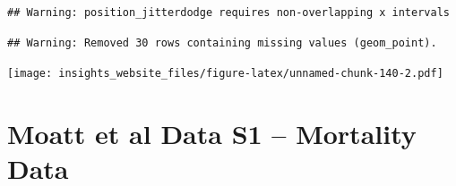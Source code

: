 \documentclass[]{book}
\newenvironment{Shaded}{\begin{snugshade}}{\end{snugshade}}
\newcommand{\DataTypeTok}[1]{\textcolor[rgb]{0.13,0.29,0.53}{#1}}
\newcommand{\DecValTok}[1]{\textcolor[rgb]{0.00,0.00,0.81}{#1}}
\newcommand{\FloatTok}[1]{\textcolor[rgb]{0.00,0.00,0.81}{#1}}
\newcommand{\KeywordTok}[1]{\textcolor[rgb]{0.13,0.29,0.53}{\textbf{#1}}}
\newcommand{\NormalTok}[1]{#1}
\newcommand{\OperatorTok}[1]{\textcolor[rgb]{0.81,0.36,0.00}{\textbf{#1}}}
\newcommand{\StringTok}[1]{\textcolor[rgb]{0.31,0.60,0.02}{#1}}
\begin{document}
\begin{Shaded}
\end{Shaded}

\begin{verbatim}
## Warning: position_jitterdodge requires non-overlapping x intervals
\end{verbatim}

\begin{verbatim}
## Warning: Removed 30 rows containing missing values (geom_point).
\end{verbatim}

\texttt{[image: insights\_website\_files/figure-latex/unnamed-chunk-140-2.pdf]}

\hypertarget{moatt-et-al-data-s1-mortality-data}{%
\section{Moatt et al Data S1 -- Mortality Data}\label{moatt-et-al-data-s1-mortality-data}}
\end{document}
